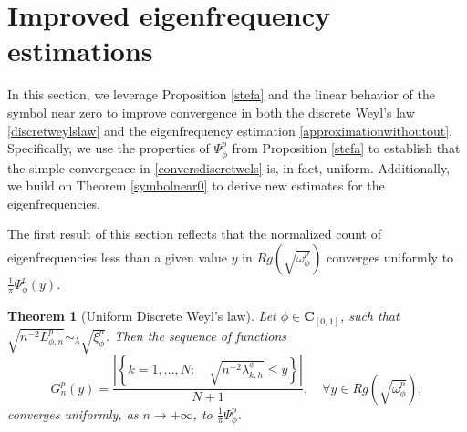 \documentclass[11pt]{article}
\newtheorem{theorem}{Theorem}[section]
\begin{document}
\section{Improved eigenfrequency estimations }\label{improvedestimation}
In this section, we leverage Proposition \ref{stefa} and the linear behavior of the symbol near zero to improve convergence in both the discrete Weyl's law \eqref{discretweylslaw} and the eigenfrequency estimation \eqref{approximationwithoutout}. Specifically, we use the properties of $\Psi^p_{\phi}$ from Proposition \ref{stefa} to establish that the simple convergence in \eqref{conversdiscretwels} is, in fact, uniform. Additionally, we build on Theorem \ref{symbolnear0} to derive new estimates for the eigenfrequencies.

The first result of this section reflects that the normalized count of eigenfrequencies less than a given value $y$ in $Rg\left(\sqrt{\omega_\phi^p}\right)$ converges uniformly to $\frac{1}{\pi}\Psi^p_{\phi}(y)$.
\begin{theorem}[Uniform Discrete Weyl’s law]\label{gedis}
Let $\phi\in\mathbf{C}_{[0,1]}$, such that \\$\sqrt{n^{-2}L_{\phi,n}^p}\sim_{\lambda} \sqrt{ \xi^p_{\phi}}$. Then the sequence of  functions 
$$
G_n^p(y)= \dfrac{\left| \left\{k=1,\dots, N:\quad \sqrt{n^{-2}\lambda_{k,h}^{\phi}}\leq y\right\}\right|}{N+1},\quad \forall y\in Rg\left(\sqrt{\omega_{\phi}^p}\right),
$$
converges uniformly, as $n \rightarrow +\infty$, to $\frac{1}{\pi}\Psi^p_{\phi}$.
\end{theorem}
\end{document}
